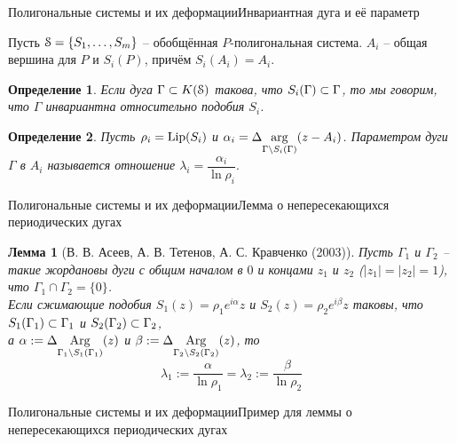 \documentclass[aspectratio=1610, 10pt, notheorems]{beamer}
\newtheorem{lemma}       {Лемма}
\newtheorem{definition}  {Определение}
\begin{document}
\begin{frame}{Полигональные системы и их деформации}{Инвариантная дуга и её параметр}

Пусть ${\EuScript S}=\{S_1,\ldots,S_m\}$ -- обобщённая $P$-полигональная система.
$A_i$ -- общая вершина для $P$ и $S_i(P)$, причём $S_i(A_i)=A_i$.

\begin{definition}
Если дуга $\Gamma\subset K({\EuScript S})$ такова, что $S_i(\Gamma)\subset\Gamma$, то мы говорим, что $\Gamma$ инвариантна относительно подобия $S_i$.
\end{definition}

\begin{definition}
Пусть $\rho_i=\mathop{\rm Lip} \nolimits(S_i)$ и $\alpha_i=\Delta\underset{\Gamma\setminus S_i(\Gamma)}{\arg}(z-A_i)$.
Параметром дуги $\Gamma$ в $A_i$ называется отношение $\lambda_i=\dfrac{\alpha_i}{\ln\rho_i}.$    
\end{definition}
\end{frame}

\begin{frame}{Полигональные системы и их деформации}{Лемма о непересекающихся периодических дугах}
\begin{lemma}[В. В. Асеев, А. В. Тетенов, А. С. Кравченко (2003)]
Пусть $\Gamma_1$ и $\Gamma_2$ -- такие жордановы дуги с общим началом в $0$ и  концами $z_1$ и $z_2$ ($|z_1|=|z_2|=1$), что $\Gamma_1\cap\Gamma_2=\{0\}$.\\
Если сжимающие подобия $S_1(z)=\rho_1 e^{i\alpha}z$ и $S_2(z)=\rho_2 e^{i\beta}z$ таковы, что $S_1(\Gamma_1)\subset\Gamma_1$ и $S_2(\Gamma_2)\subset\Gamma_2$,\\ 
а $\alpha:=\Delta\underset{{\Gamma_1\setminus S_1(\Gamma_1)}}{\mathrm {Arg}}(z)$ и $\beta:=\Delta\underset{{\Gamma_2\setminus S_2(\Gamma_2)}}{\mathrm {Arg}}(z)$, то
$$\lambda_1:=\dfrac{\alpha}{\ln\rho_1} = \lambda_2:=\dfrac{\beta}{\ln\rho_2}$$
\end{lemma}

\end{frame}

\begin{frame}{Полигональные системы и их деформации}{Пример для леммы о непересекающихся периодических дугах}
\end{frame}
\end{document}
